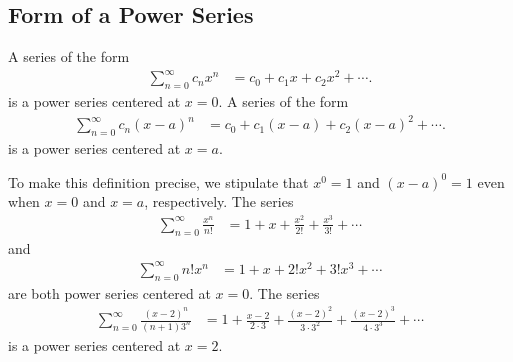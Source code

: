 \documentclass{report}
\begin{document}
    \subsection*{Form of a Power Series}
    \bigbreak \noindent 
    \begin{definition}
        A series of the form
    \begin{align*}
        \sum_{n=0}^{\infty} c_n x^n &= c_0 + c_1 x + c_2 x^2 + \cdots 
    .\end{align*}
    is a power series centered at \( x = 0 \).
    \bigbreak \noindent 
    A series of the form
    \begin{align*}
        \sum_{n=0}^{\infty} c_n (x - a)^n &= c_0 + c_1 (x - a) + c_2 (x - a)^2 + \cdots 
    .\end{align*}
    is a power series centered at \( x = a \).
    \end{definition}
    
    \bigbreak \noindent 
    To make this definition precise, we stipulate that \( x^0 = 1 \) and \( (x - a)^0 = 1 \) even when \( x = 0 \) and \( x = a \), respectively.
    \bigbreak \noindent 
    The series
    \begin{align*}
        \sum_{n=0}^{\infty} \frac{x^n}{n!} &= 1 + x + \frac{x^2}{2!} + \frac{x^3}{3!} + \cdots
    \end{align*}
    and
    \begin{align*}
        \sum_{n=0}^{\infty} n! x^n &= 1 + x + 2! x^2 + 3! x^3 + \cdots
    \end{align*}
    are both power series centered at \( x = 0 \).
    \bigbreak \noindent 
    The series
    \begin{align*}
        \sum_{n=0}^{\infty} \frac{(x - 2)^n}{(n + 1)3^n} &= 1 + \frac{x - 2}{2 \cdot 3} + \frac{(x - 2)^2}{3 \cdot 3^2} + \frac{(x - 2)^3}{4 \cdot 3^3} + \cdots
    \end{align*}
    is a power series centered at \( x = 2 \).

    \bigbreak \noindent 
\end{document}

